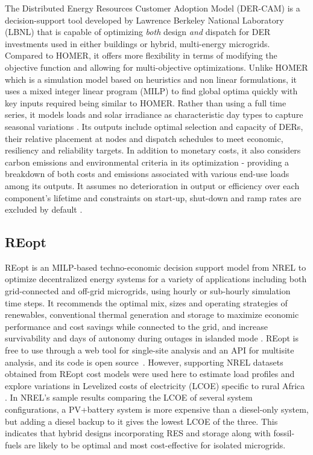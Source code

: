 \documentclass[final,3p,times]{elsarticle}
\begin{document}
The Distributed Energy Resources Customer Adoption Model (DER-CAM) is a decision-support tool developed by Lawrence Berkeley National Laboratory (LBNL) that is capable of optimizing \textit{both} design \textit{and} dispatch for DER investments used in either buildings or hybrid, multi-energy microgrids. Compared to HOMER, it offers more flexibility in terms of modifying the objective function and allowing for multi-objective optimizations. Unlike HOMER which is a simulation model based on heuristics and non linear formulations, it uses a mixed integer linear program (MILP) to find global optima quickly \cite{dercam} with key inputs required being similar to HOMER. Rather than using a full time series, it models loads and solar irradiance as characteristic day types to capture seasonal variations \cite{weng2016}. Its outputs include optimal selection and capacity of DERs, their relative placement at nodes and dispatch schedules to meet economic, resiliency and reliability targets. In addition to monetary costs, it also considers carbon emissions and environmental criteria in its optimization - providing a breakdown of both costs and emissions associated with various end-use loads among its outputs. It assumes no deterioration in output or efficiency over each component's lifetime and constraints on start-up, shut-down and ramp rates are excluded by default \cite{dercam}.

\subsection{REopt}

REopt is an MILP-based techno-economic decision support model from NREL to optimize decentralized energy systems for a variety of applications including both grid-connected and off-grid microgrids, using hourly or sub-hourly simulation time steps. It recommends the optimal mix, sizes and operating strategies of renewables, conventional thermal generation and storage to maximize economic performance and cost savings while connected to the grid, and increase survivability and days of autonomy during outages in islanded mode \cite{tools_summary}. REopt is free to use through a web tool for single-site analysis and an API for multisite analysis, and its code is open source~\cite{reopt_news}. However, supporting NREL datasets obtained from REopt cost models were used here to estimate load profiles and explore variations in Levelized costs of electricity (LCOE) specific to rural Africa \cite{nrel_data}. In NREL's sample results comparing the LCOE of several system configurations, a PV+battery system is more expensive than a diesel-only system, but adding a diesel backup to it gives the lowest LCOE of the three. This indicates that hybrid designs incorporating RES and storage along with fossil-fuels are likely to be optimal and most cost-effective for isolated microgrids.
\end{document}
